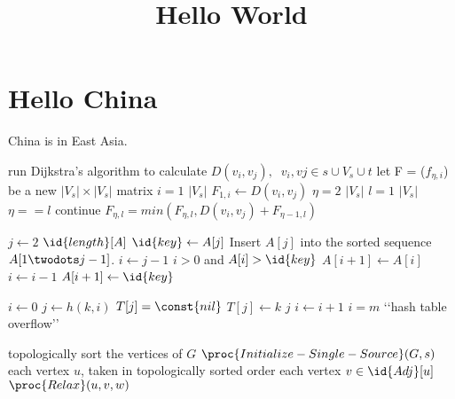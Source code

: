 \documentclass{article}
\title{Hello World}
\begin{document}
\maketitle
\section{Hello China} China is in East Asia.
\begin{codebox}
\li	run Dijkstra's algorithm to calculate $D(v_i,v_j),\; \;v_{i},v{j} \in s\cup V_{s}\cup t$
\li	let F = ($f_{\eta,i}$) be a new $|V_{s}| \times |V_{s}|$ matrix
\li \For $i=1$ \To $|V_{s}|$						
\li 		 \Do $F_{1,i} \gets D(v_i,v_j)$			
		\End		                              
\li \For $\eta=2$ \To $|V_{s}|$		
\li 		\Do
 		\For $l=1$ \To $|V_{s}|$				
\li 				\If $\eta==l$							
\li 				\Then		continue							
\li 				\Else $F_{\eta,l} = min(F_{\eta,l},D(v_i,v_j)+F_{\eta -1,l}) $	
	  \End 				
\end{codebox}
\begin{codebox}
\li \For $j \gets 2$ \To $\id{length}[A]$    \label{li:for}
\li     \Do $\id{key} \gets A[j]$            \label{li:for-begin}
\li         \Comment Insert $A[j]$ into the sorted sequence $A[1 \twodots j-1]$.
\li         $i \gets j-1$
\li         \While $i>0$ and $A[i]>\id{key}$ \label{li:while}
\li            \Do $A[i+1] \gets A[i]$       \label{li:while-begin}
\li                $i \gets i-1$             \label{li:while-end}
                \End
\li         $A[i+1] \gets \id{key}$          \label{li:for-end}
        \End
\end{codebox}
\begin{codebox}
\li $i \gets 0$
\li \Repeat
$j \gets h(k,i)$
\li \If $T[j] = \const{nil}$
\li \Then $T[j]\gets k$
\li \Return $j$
\li \Else $i \gets i+1$
\End
\li \Until $i = m$
\li \Error ‘‘hash table overflow’’
\end{codebox}
\begin{codebox}
\li topologically sort the vertices of $G$ \label{li:dag-sp-topo-sort}
\li $\proc{Initialize-Single-Source}(G,s)$ \label{li:dag-sp-init}
\li \For each vertex $u$, taken in topologically sorted order
\label{li:dag-sp-loop-begin}
\li \Do
\For each vertex $v \in \id{Adj}[u]$
\label{li:dag-sp-inner-begin}
\li \Do $\proc{Relax}(u,v,w)$ \label{li:dag-sp-loop-end}
\End
\End
\end{codebox}
\end{document}
